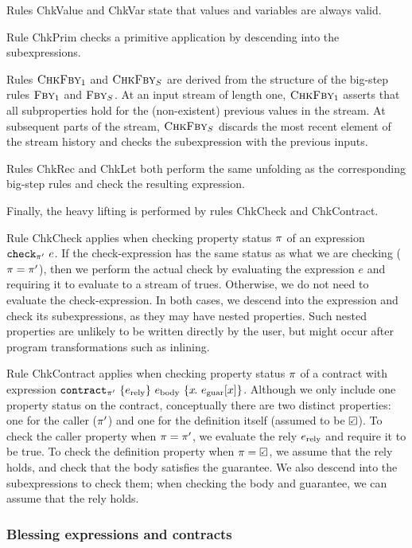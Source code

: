 \documentclass[a4paper,UKenglish,cleveref, autoref, thm-restate,anonymous]{lipics-v2021}
\begin{document}
Rules {\sc ChkValue} and {\sc ChkVar} state that values and variables are always valid.

Rule {\sc ChkPrim} checks a primitive application by descending into the subexpressions.

Rules $\textsc{ChkFby}_1$ and $\textsc{ChkFby}_S$ are derived from the structure of the big-step rules  $\textsc{Fby}_1$ and $\textsc{Fby}_S$.
At an input stream of length one, $\textsc{ChkFby}_1$ asserts that all subproperties hold for the (non-existent) previous values in the stream.
At subsequent parts of the stream, $\textsc{ChkFby}_S$ discards the most recent element of the stream history and checks the subexpression with the previous inputs.


Rules {\sc ChkRec} and {\sc ChkLet} both perform the same unfolding as the corresponding big-step rules and check the resulting expression.

Finally, the heavy lifting is performed by rules {\sc ChkCheck} and {\sc ChkContract}.

Rule {\sc ChkCheck} applies when checking property status $\pi$ of an expression $\texttt{check}_{\pi'}~e$.
If the check-expression has the same status as what we are checking ($\pi = \pi'$), then we perform the actual check by evaluating the expression $e$ and requiring it to evaluate to a stream of trues.
Otherwise, we do not need to evaluate the check-expression.
In both cases, we descend into the expression and check its subexpressions, as they may have nested properties.
Such nested properties are unlikely to be written directly by the user, but might occur after program transformations such as inlining.

Rule {\sc ChkContract} applies when checking property status $\pi$ of a contract with expression $\texttt{contract}_{\pi'}~\{e_{\text{rely}}\}~e_{\text{body}}~\{x\hspace{-0.1em}.~e_{\text{guar}}[x]\}$.
Although we only include one property status on the contract, conceptually there are two distinct properties: one for the caller ($\pi'$) and one for the definition itself (assumed to be $\PSValid$).
To check the caller property when $\pi = \pi'$, we evaluate the rely $e_{\text{rely}}$ and require it to be true.
To check the definition property when $\PStatus = \PSValid$, we assume that the rely holds, and check that the body satisfies the guarantee.
We also descend into the subexpressions to check them; when checking the body and guarantee, we can assume that the rely holds.


\subsubsection{Blessing expressions and contracts}
\label{s:core:blessing}
\end{document}
